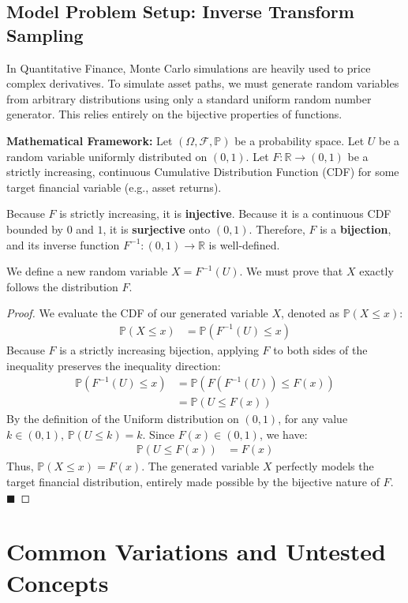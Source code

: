 \documentclass[11pt, a4paper]{article}
\theoremstyle{definition}
\theoremstyle{remark}
\newcommand{\R}{\mathbb{R}}
\newcommand{\Prob}{\mathbb{P}}
\newcommand{\F}{\mathcal{F}}
\begin{document}
\subsection{Model Problem Setup: Inverse Transform Sampling}
In Quantitative Finance, Monte Carlo simulations are heavily used to price complex derivatives. To simulate asset paths, we must generate random variables from arbitrary distributions using only a standard uniform random number generator. This relies entirely on the bijective properties of functions.

\textbf{Mathematical Framework:}
Let $(\Omega, \F, \Prob)$ be a probability space. Let $U$ be a random variable uniformly distributed on $(0, 1)$. 
Let $F: \R \to (0, 1)$ be a strictly increasing, continuous Cumulative Distribution Function (CDF) for some target financial variable (e.g., asset returns). 

Because $F$ is strictly increasing, it is \textbf{injective}. Because it is a continuous CDF bounded by $0$ and $1$, it is \textbf{surjective} onto $(0, 1)$. Therefore, $F$ is a \textbf{bijection}, and its inverse function $F^{-1}: (0, 1) \to \R$ is well-defined.

We define a new random variable $X = F^{-1}(U)$. We must prove that $X$ exactly follows the distribution $F$.
\begin{proof}
We evaluate the CDF of our generated variable $X$, denoted as $\Prob(X \le x)$:
\begin{align*}
\Prob(X \le x) &= \Prob(F^{-1}(U) \le x)
\end{align*}
Because $F$ is a strictly increasing bijection, applying $F$ to both sides of the inequality preserves the inequality direction:
\begin{align*}
\Prob(F^{-1}(U) \le x) &= \Prob(F(F^{-1}(U)) \le F(x)) \\
&= \Prob(U \le F(x))
\end{align*}
By the definition of the Uniform distribution on $(0, 1)$, for any value $k \in (0, 1)$, $\Prob(U \le k) = k$. Since $F(x) \in (0, 1)$, we have:
\begin{align*}
\Prob(U \le F(x)) &= F(x)
\end{align*}
Thus, $\Prob(X \le x) = F(x)$. The generated variable $X$ perfectly models the target financial distribution, entirely made possible by the bijective nature of $F$. $\blacksquare$
\end{proof}

\newpage
\section{Common Variations and Untested Concepts}
\end{document}
